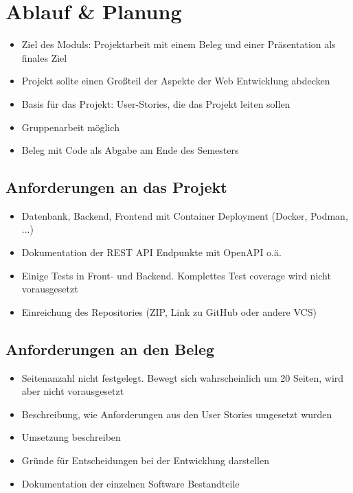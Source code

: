 \documentclass[../main.tex]{subfiles}
\begin{document}
\section{Ablauf \& Planung}
\begin{itemize}
    \item Ziel des Moduls: Projektarbeit mit einem Beleg und einer Präsentation als finales Ziel
    \item Projekt sollte einen Großteil der Aspekte der Web Entwicklung abdecken
    \item Basis für das Projekt: User-Stories, die das Projekt leiten sollen
    \item Gruppenarbeit möglich
    \item Beleg mit Code als Abgabe am Ende des Semesters
\end{itemize}

\subsection{Anforderungen an das Projekt}
\begin{itemize}
    \item Datenbank, Backend, Frontend mit Container Deployment (Docker, Podman, ...)
    \item Dokumentation der REST API Endpunkte mit OpenAPI o.ä.
    \item Einige Tests in Front- und Backend. Komplettes Test coverage wird nicht vorausgesetzt
    \item Einreichung des Repositories (ZIP, Link zu GitHub oder andere VCS)
\end{itemize}

\subsection{Anforderungen an den Beleg}
\begin{itemize}
    \item Seitenanzahl nicht festgelegt. Bewegt sich wahrscheinlich um 20 Seiten, wird aber nicht vorausgesetzt
    \item Beschreibung, wie Anforderungen aus den User Stories umgesetzt wurden
    \item Umsetzung beschreiben
    \item Gründe für Entscheidungen bei der Entwicklung darstellen
    \item Dokumentation der einzelnen Software Bestandteile 
\end{itemize}
\end{document}
